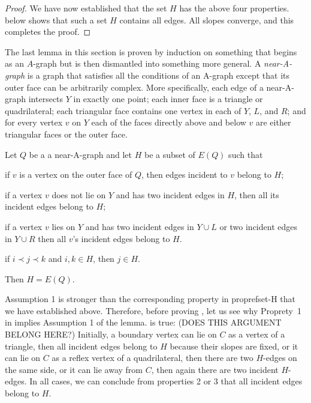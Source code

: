 \documentclass{patmorin}
\begin{document}
\begin{proof}
We have now established that the set $H$ has
 the above four properties.
    below shows that such a set
   $H$ contains all edges. All slopes converge, and this 
   completes the proof.
\end{proof}


The last lemma in this section is proven by induction on something
that begins as an $A$-graph but is then dismantled into something
more general.  A \emph{near-A-graph} is a graph that satisfies all the
conditions of an A-graph except that its outer face can be arbitrarily
complex.  More specifically, each edge of a near-A-graph intersects $Y$
in exactly one point; each inner face is a triangle or quadrilateral;
each triangular face contains one vertex in each of $Y$, $L$, and $R$;
and for every vertex $v$ on $Y$ each of the faces directly above and
below $v$ are either triangular faces or the outer face.

\begin{lem}
  Let $Q$ be a a near-A-graph and let $H$
  be a subset of $E(Q)$ such that
   \begin{compactenum}
    \item if $v$ is a vertex on the outer face 
      of $Q$, then edges incident to $v$ belong to $H$;
    \item
if a vertex $v$ does not lie on $Y$ and has two incident edges in
$H$,
then all its incident edges belong to $H$;
    \item
if a vertex $v$ lies on $Y$ and has two incident edges in
$Y\cup L$ or two incident edges in $Y\cup R$
then all $v$'s incident edges belong to $H$.
    \item if $i \prec j \prec k$ and $i,k\in H$, 
      then $j\in H$.
   \end{compactenum}
   Then $H=E(Q)$.
\end{lem}

Assumption 1 is stronger than the corresponding property in
propref{set-H} that we have established above.
%
Therefore, before proving , let us see why Proprety~1 in  implies Assumption 1 of the lemma.  is true: (DOES THIS ARGUMENT BELONG HERE?)
Initially, a boundary vertex
 can
lie on $C$ as a vertex of a triangle, then all incident edges belong to $H$ because their slopes
are fixed,
or it
 can
lie on $C$ as a reflex vertex of a quadrilateral, then there are two
$H$-edges on the same side,
or it can
lie away from $C$, then again there are two
incident $H$-edges.
In all cases, we can conclude from properties 2 or 3 that all incident edges belong to $H$.
\end{document}
